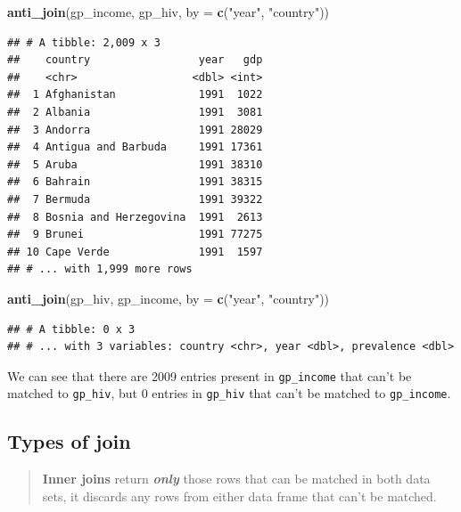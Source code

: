 \documentclass[]{book}
\newenvironment{Shaded}{\begin{snugshade}}{\end{snugshade}}
\newcommand{\KeywordTok}[1]{\textcolor[rgb]{0.13,0.29,0.53}{\textbf{{#1}}}}
\newcommand{\DataTypeTok}[1]{\textcolor[rgb]{0.13,0.29,0.53}{{#1}}}
\newcommand{\StringTok}[1]{\textcolor[rgb]{0.31,0.60,0.02}{{#1}}}
\newcommand{\NormalTok}[1]{{#1}}
\theoremstyle{definition}
\theoremstyle{definition}
\theoremstyle{definition}
\theoremstyle{remark}
\begin{document}
\begin{Shaded}
\begin{Highlighting}[]
\KeywordTok{anti_join}\NormalTok{(gp_income, gp_hiv, }\DataTypeTok{by =} \KeywordTok{c}\NormalTok{(}\StringTok{"year"}\NormalTok{, }\StringTok{"country"}\NormalTok{))}
\end{Highlighting}
\end{Shaded}

\begin{verbatim}
## # A tibble: 2,009 x 3
##    country                 year   gdp
##    <chr>                  <dbl> <int>
##  1 Afghanistan             1991  1022
##  2 Albania                 1991  3081
##  3 Andorra                 1991 28029
##  4 Antigua and Barbuda     1991 17361
##  5 Aruba                   1991 38310
##  6 Bahrain                 1991 38315
##  7 Bermuda                 1991 39322
##  8 Bosnia and Herzegovina  1991  2613
##  9 Brunei                  1991 77275
## 10 Cape Verde              1991  1597
## # ... with 1,999 more rows
\end{verbatim}

\begin{Shaded}
\begin{Highlighting}[]
\KeywordTok{anti_join}\NormalTok{(gp_hiv, gp_income, }\DataTypeTok{by =} \KeywordTok{c}\NormalTok{(}\StringTok{"year"}\NormalTok{, }\StringTok{"country"}\NormalTok{))}
\end{Highlighting}
\end{Shaded}

\begin{verbatim}
## # A tibble: 0 x 3
## # ... with 3 variables: country <chr>, year <dbl>, prevalence <dbl>
\end{verbatim}

We can see that there are 2009 entries present in \texttt{gp\_income}
that can't be matched to \texttt{gp\_hiv}, but 0 entries in
\texttt{gp\_hiv} that can't be matched to \texttt{gp\_income}.

\subsection{Types of join}\label{types-of-join}

\begin{quote}
\textbf{Inner joins} return \textbf{\emph{only}} those rows that can be
matched in both data sets, it discards any rows from either data frame
that can't be matched.
\end{quote}
\end{document}
